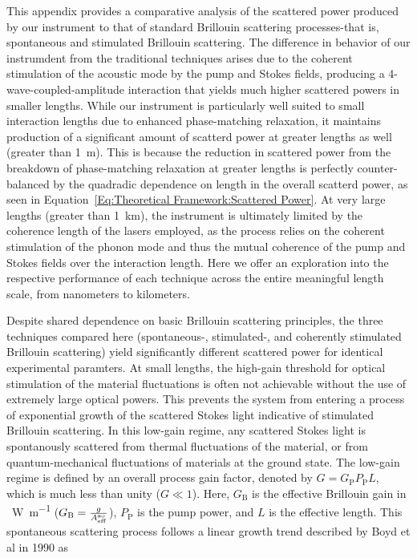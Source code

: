 This appendix provides a comparative analysis of the scattered power produced by our instrument to that of standard Brillouin scattering processes-that is, spontaneous and stimulated Brillouin scattering. The difference in behavior of our instrumdent from the traditional techniques arises due to the coherent stimulation of the acoustic mode by the pump and Stokes fields, producing a 4-wave-coupled-amplitude interaction that yields much higher scattered powers in smaller lengths. While our instrument is particularly well suited to small interaction lengths due to enhanced phase-matching relaxation, it maintains production of a significant amount of scatterd power at greater lengths as well (greater than \SI{1}{\meter}). This is because the reduction in scattered power from the breakdown of phase-matching relaxation at greater lengths is perfectly counter-balanced by the quadradic dependence on length in the overall scatterd power, as seen in Equation~\ref{Eq:Theoretical Framework:Scattered Power}. At very large lengths (greater than \SI{1}{\kilo\meter}), the instrument is ultimately limited by the coherence length of the lasers employed, as the process relies on the coherent stimulation of the phonon mode and thus the mutual coherence of the pump and Stokes fields over the interaction length. Here we offer an exploration into the respective performance of each technique across the entire meaningful length scale, from nanometers to kilometers.

Despite shared dependence on basic Brillouin scattering principles, the three techniques compared here (spontaneous-, stimulated-, and coherently stimulated Brillouin scattering) yield significantly different scattered power for identical experimental paramters. At small lengths, the high-gain threshold for optical stimulation of the material fluctuations is often not achievable without the use of extremely large optical powers. This prevents the system from entering a process of exponential growth of the scattered Stokes light indicative of stimulated Brillouin scattering.\cite{boyd2020nonlinear} In this low-gain regime, any scattered Stokes light is spontanously scattered from thermal fluctuations of the material, or from quantum-mechanical fluctuations of materials at the ground state. The low-gain regime is defined by an overall process gain factor, denoted by \(G = G_{\mathrm{P}}P_{\mathrm{P}}L\), which is much less than unity (\(G \ll 1\)). Here, \(G_{\mathrm{B}}\) is the effective Brillouin gain in \si{\per\watt\per\meter} (\(G_{\mathrm{B}} = \frac{g}{A_{\rm eff}^{\rm ao}}\)), \(P_{\mathrm{P}}\) is the pump power, and \(L\) is the effective length. This spontaneous scattering process follows a linear growth trend described by Boyd et al in 1990 \cite{boyd1990noise} as

